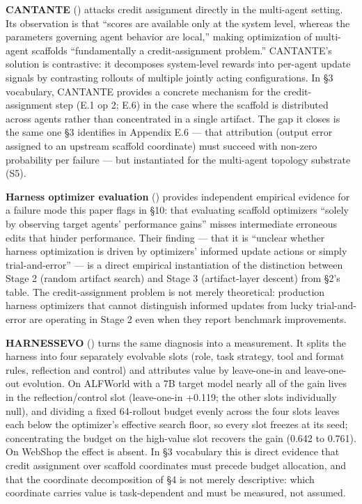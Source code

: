 \documentclass[
]{article}
\begin{document}
\textbf{CANTANTE} () attacks
credit assignment directly in the multi-agent setting. Its observation
is that ``scores are available only at the system level, whereas the
parameters governing agent behavior are local,'' making optimization of
multi-agent scaffolds ``fundamentally a credit-assignment problem.''
CANTANTE's solution is contrastive: it decomposes system-level rewards
into per-agent update signals by contrasting rollouts of multiple
jointly acting configurations. In §3 vocabulary, CANTANTE provides a
concrete mechanism for the credit-assignment step (E.1 op 2; E.6) in the
case where the scaffold is distributed across agents rather than
concentrated in a single artifact. The gap it closes is the same one §3
identifies in Appendix E.6 --- that attribution (output error assigned
to an upstream scaffold coordinate) must succeed with non-zero
probability per failure --- but instantiated for the multi-agent
topology substrate (S5).

\textbf{Harness optimizer evaluation}
() provides
independent empirical evidence for a failure mode this paper flags in
§10: that evaluating scaffold optimizers ``solely by observing target
agents' performance gains'' misses intermediate erroneous edits that
hinder performance. Their finding --- that it is ``unclear whether
harness optimization is driven by optimizers' informed update actions or
simply trial-and-error'' --- is a direct empirical instantiation of the
distinction between Stage 2 (random artifact search) and Stage 3
(artifact-layer descent) from §2's table. The credit-assignment problem
is not merely theoretical: production harness optimizers that cannot
distinguish informed updates from lucky trial-and-error are operating in
Stage 2 even when they report benchmark improvements.

\textbf{HARNESSEVO} () turns the same diagnosis into a measurement. It splits the
harness into four separately evolvable slots (role, task strategy, tool
and format rules, reflection and control) and attributes value by
leave-one-in and leave-one-out evolution. On ALFWorld with a 7B target
model nearly all of the gain lives in the reflection/control slot
(leave-one-in +0.119; the other slots individually null), and dividing a
fixed 64-rollout budget evenly across the four slots leaves each below
the optimizer's effective search floor, so every slot freezes at its
seed; concentrating the budget on the high-value slot recovers the gain
(0.642 to 0.761). On WebShop the effect is absent. In §3 vocabulary this
is direct evidence that credit assignment over scaffold coordinates must
precede budget allocation, and that the coordinate decomposition of §4
is not merely descriptive: which coordinate carries value is
task-dependent and must be measured, not assumed.
\end{document}
